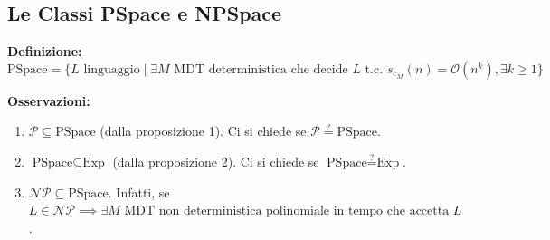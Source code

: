 \vspace{0.8cm}
\subsection{Le Classi PSpace e NPSpace}

\textbf{Definizione:} 
$$ \text{PSpace} = \{ L \text{ linguaggio} \mid \exists M \text{ MDT deterministica che decide } L \text{ t.c. } s_{c_M}(n) = \mathcal{O}(n^k), \exists k \ge 1 \} $$

\textbf{Osservazioni:}
\begin{enumerate}
    \item $\mathcal{P} \subseteq \text{PSpace}$ (dalla proposizione 1). Ci si chiede se $\mathcal{P} \stackrel{?}{=} \text{PSpace}$.
    \item $\text{PSpace} \subseteq \text{Exp}$ (dalla proposizione 2). Ci si chiede se $\text{PSpace} \stackrel{?}{=} \text{Exp}$.
    \item $\mathcal{NP} \subseteq \text{PSpace}$. Infatti, se $L \in \mathcal{NP} \implies \exists M \text{ MDT non deterministica polinomiale in tempo che accetta } L$.
\end{enumerate}

